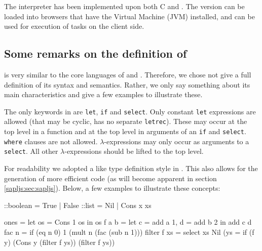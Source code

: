 The \Sapl interpreter has been implemented upon both \textsf{C} and \Java. The
\Java version can be loaded into browsers that have the \Java Virtual Machine
(JVM) installed, and can be used for execution of \iTask tasks on the client
side.

\subsection{Some remarks on the definition of \Sapl}
\Sapl is very similar to the core languages of \Haskell and \Clean. 
Therefore, we chose not give a full definition of its syntax and semantics.
Rather, we only say something about its main characteristics and give a few
examples to illustrate these.

The only keywords in \Sapl are \texttt{let}, \texttt{if} and \texttt{select}.
Only constant \texttt{let} expressions are allowed (that may be cyclic, \Sapl
has no separate \texttt{letrec}). These may occur at the top level in a function 
and at the top level in arguments of an \texttt{if} and \texttt{select}.
\texttt{where} clauses are not allowed. $\lambda$-expressions may only occur as 
arguments to a \texttt{select}. All other $\lambda$-expressions should be
lifted to the top level. 

For readability we adopted a \Clean like type definition style in \Sapl. This
also allows for the generation of more efficient code (as will become apparent
in section \ref{sapljs:sec:sapljs}). 
Below, a few examples to illustrate these concepts:

\begin{CleanCode}
::boolean = True | False
::list    = Nil  | Cons x xs
 
ones        = let os = Cons 1 os in os 
f a b       = let c = add a 1, d = add b 2 in add c d
fac n       = if (eq n 0) 1 (mult n (fac (sub n 1))) 
filter f xs = select xs Nil (\y ys = if (f y) (Cons y (filter f ys)) (filter f ys))
\end{CleanCode}





